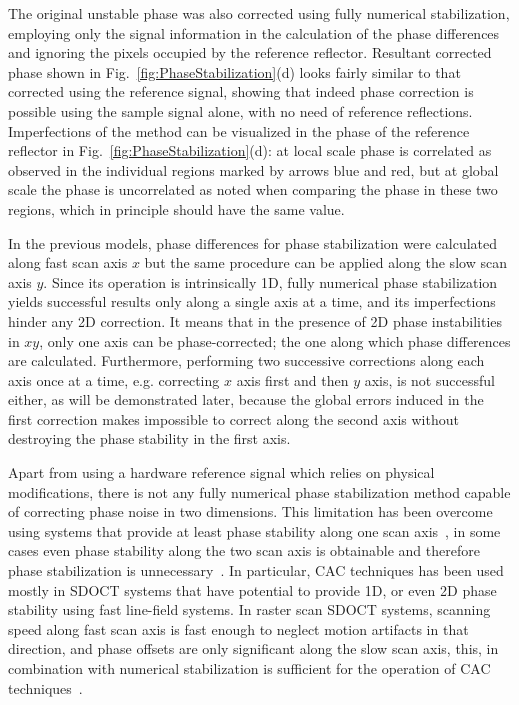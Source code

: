 The original unstable phase was also corrected using fully numerical stabilization, employing only the signal information in the calculation of the phase differences and ignoring the pixels occupied by the reference reflector. Resultant corrected phase shown in Fig.~\ref{fig:PhaseStabilization}(d) looks fairly similar to that corrected using the reference signal, showing that indeed phase correction is possible using the sample signal alone, with no need of reference reflections. Imperfections of the method can be visualized in the phase of the reference reflector in Fig.~\ref{fig:PhaseStabilization}(d): at local scale phase is correlated as observed in the individual regions marked by arrows blue and red, but at global scale the phase is uncorrelated as noted when comparing the phase in these two regions, which in  principle should have the same value.

\FloatBarrier

In the previous models, phase differences for phase stabilization were calculated along fast scan axis $x$ but the same procedure can be applied along the slow scan axis $y$. Since its operation is intrinsically 1D, fully numerical phase stabilization yields successful results only along a single axis at a time, and its imperfections hinder any 2D correction. It means that in the presence of 2D phase instabilities in $xy$, only one axis can be phase-corrected; the one along which phase differences are calculated. Furthermore, performing two successive corrections along each axis once at a time, e.g. correcting $x$ axis first and then $y$ axis, is not successful either, as will be demonstrated later, because the global errors induced in the first correction makes impossible to correct along the second axis without destroying the phase stability in the first axis.

Apart from using a hardware reference signal which relies on physical modifications, there is not any fully numerical phase stabilization method capable of correcting phase noise in two dimensions. This limitation has been overcome using systems that provide at least phase stability along one scan axis~\cite{Ginner2017_Noniterative, Shemonski2014_Threedimensional, Fechtig2015_Highspeed, Ginner2018_Holographic, Leitgeb2016_Digital,Yasuno2006_Noniterative, South2019_Local}, in some cases even phase stability along the two scan axis is obtainable and therefore phase stabilization is unnecessary~\cite{Kumar2013_Subaperture, Hillmann2016_Aberrationfree, Pande2016_Automated, Kumar2015_Anisotropic,Sudkamp2018_Simple}. In particular, CAC techniques has been used mostly in SDOCT systems that have potential to provide 1D, or even 2D phase stability using fast line-field systems. In raster scan SDOCT systems, scanning speed along fast scan axis is fast enough to neglect motion artifacts in that direction, and phase offsets are only significant along the slow scan axis, this, in combination with numerical stabilization is sufficient for the operation of CAC techniques~\cite{Shemonski2014_Threedimensional}.

